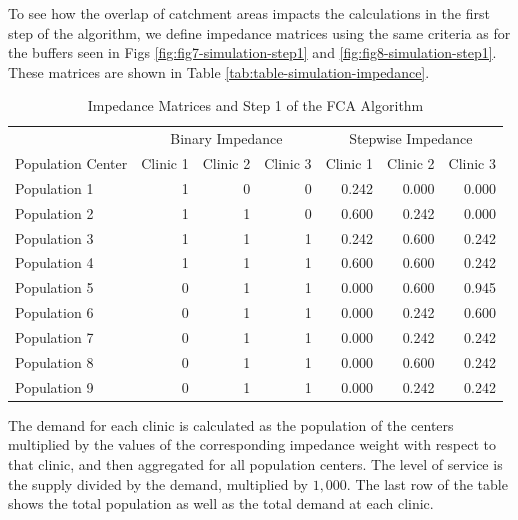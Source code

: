 \documentclass[10pt,letterpaper]{article}
\begin{document}
To see how the overlap of catchment areas impacts the calculations in
the first step of the algorithm, we define impedance matrices using the
same criteria as for the buffers seen in Figs
\ref{fig:fig7-simulation-step1} and \ref{fig:fig8-simulation-step1}.
These matrices are shown in Table \ref{tab:table-simulation-impedance}.

\begin{table}[t]

\caption{\label{tab:table-simulation-impedance}\label{tab:table-simulation-step1-impedance}Impedance Matrices and Step 1 of the FCA Algorithm}
\centering
\fontsize{7}{9}\selectfont
\begin{tabular}{lrrrrrr}
\toprule
\multicolumn{1}{c}{ } & \multicolumn{3}{c}{Binary Impedance} & \multicolumn{3}{c}{Stepwise Impedance} \\
\cmidrule(l{3pt}r{3pt}){2-4} \cmidrule(l{3pt}r{3pt}){5-7}
Population Center & Clinic 1 & Clinic 2 & Clinic 3 & Clinic 1 & Clinic 2 & Clinic 3\\
\midrule
Population 1 & 1 & 0 & 0 & 0.242 & 0.000 & 0.000\\
Population 2 & 1 & 1 & 0 & 0.600 & 0.242 & 0.000\\
Population 3 & 1 & 1 & 1 & 0.242 & 0.600 & 0.242\\
Population 4 & 1 & 1 & 1 & 0.600 & 0.600 & 0.242\\
Population 5 & 0 & 1 & 1 & 0.000 & 0.600 & 0.945\\
\addlinespace
Population 6 & 0 & 1 & 1 & 0.000 & 0.242 & 0.600\\
Population 7 & 0 & 1 & 1 & 0.000 & 0.242 & 0.242\\
Population 8 & 0 & 1 & 1 & 0.000 & 0.600 & 0.242\\
Population 9 & 0 & 1 & 1 & 0.000 & 0.242 & 0.242\\
\bottomrule
\end{tabular}
\end{table}

The demand for each clinic is calculated as the population of the
centers multiplied by the values of the corresponding impedance weight
with respect to that clinic, and then aggregated for all population
centers. The level of service is the supply divided by the demand,
multiplied by \(1,000\). The last row of the table shows the total
population as well as the total demand at each clinic.
\end{document}
